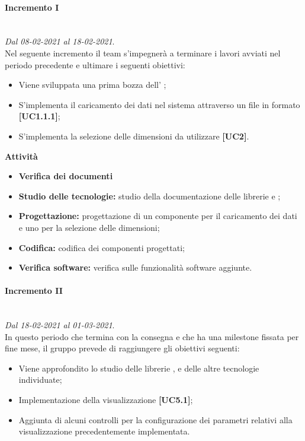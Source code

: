 \paragraph{Incremento I} \textit{}\\ \textit{Dal 08-02-2021 al 18-02-2021}. \\ Nel seguente incremento il team s'impegnerà a terminare i lavori avviati nel periodo precedente e ultimare i seguenti obiettivi:
		\begin{itemize}
			\item Viene sviluppata una prima bozza dell' ;
			\item S'implementa il caricamento dei dati nel sistema attraverso un file in formato  \textbf{[UC1.1.1]};
			\item S'implementa la selezione delle dimensioni da utilizzare \textbf{[UC2]}.
		\end{itemize}	
		
\textbf{Attività}			

\begin{itemize}
\item \textbf{Verifica dei documenti}
\item \textbf{Studio delle tecnologie:} studio della documentazione delle librerie  e ;
\item \textbf{Progettazione:} progettazione di un componente per il caricamento dei dati e uno per la selezione delle dimensioni;
\item \textbf{Codifica:} codifica dei componenti progettati;
\item \textbf{Verifica software:} verifica sulle funzionalità software aggiunte.
\end{itemize}

\paragraph{Incremento II} \textit{}\\ \textit{Dal 18-02-2021 al 01-03-2021}.\\ In questo periodo che termina con la consegna e che ha una milestone fissata per fine mese, il gruppo prevede di raggiungere gli obiettivi seguenti:
		\begin{itemize}
			\item Viene approfondito lo studio delle librerie ,  e delle altre tecnologie individuate;
			\item Implementazione della visualizzazione  \textbf{[UC5.1]};
			\item Aggiunta di alcuni controlli per la configurazione dei parametri relativi alla visualizzazione precedentemente implementata. 
		\end{itemize}			
	

